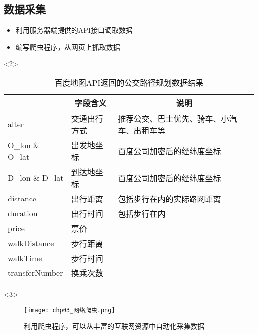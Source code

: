 \subsection{数据采集}
\begin{frame}[t]{\subsecname}
\begin{itemize}
\item<2-> 利用服务器端提供的API接口调取数据
\item<3-> 编写爬虫程序，从网页上抓取数据
\end{itemize}

\begin{overlayarea}{\textwidth}{\textheight}

  \begin{onlyenv}<2>
\begin{table} \centering \scriptsize
  \renewcommand\arraystretch{0.9}
  \begin{tabular}{|m{}|m{}|m{}|}
    \toprule
    \rowcolor{LightCyan}
\multicolumn{1}{|c|}{\textbf{字段名称}} & \multicolumn{1}{c|}{\textbf{字段含义}} & \multicolumn{1}{c|}{\textbf{说明}}\\\hline
     alter & 交通出行方式 & 推荐公交、巴士优先、骑车、小汽车、出租车等 \\\hline
     O\_lon \& O\_lat & 出发地坐标 & 百度公司加密后的经纬度坐标 \\\hline
     D\_lon \& D\_lat & 到达地坐标 & 百度公司加密后的经纬度坐标 \\\hline
     distance & 出行距离 & 包括步行在内的实际路网距离\\\hline
     duration & 出行时间 & 包括步行在内 \\\hline
     price & 票价 & \\\hline
     walkDistance & 步行距离 & \\\hline
     walkTime & 步行时间 & \\\hline
     transferNumber & 换乘次数 & \\    
     \bottomrule
  \end{tabular}
\caption{百度地图API返回的公交路径规划数据结果}
\end{table}
  \end{onlyenv}

\vspace{-15pt}
  \begin{onlyenv}<3>
\begin{figure}
  \texttt{[image: chp03\_网络爬虫.png]}
  \caption{利用爬虫程序，可以从丰富的互联网资源中自动化采集数据}
\end{figure}
  \end{onlyenv}
\end{overlayarea}

\end{frame}

